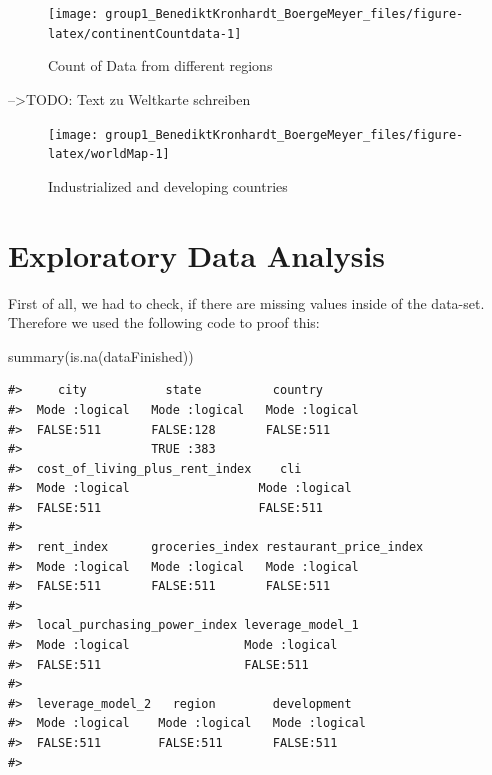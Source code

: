 \documentclass[
  11pt,
  a4paper,
  twoside]{scrbook}
\newenvironment{Shaded}{\begin{snugshade}}{\end{snugshade}}
\newcommand{\FunctionTok}[1]{\textcolor[rgb]{0.00,0.00,0.00}{#1}}
\newcommand{\NormalTok}[1]{#1}
\begin{document}
\begin{figure}

{\centering \texttt{[image: group1\_BenediktKronhardt\_BoergeMeyer\_files/figure-latex/continentCountdata-1]} 

}

\caption{Count of Data from different regions}\label{fig:continentCountdata}
\end{figure}

--\textgreater TODO: Text zu Weltkarte schreiben

\begin{figure}

{\centering \texttt{[image: group1\_BenediktKronhardt\_BoergeMeyer\_files/figure-latex/worldMap-1]} 

}

\caption{Industrialized and developing countries}\label{fig:worldMap}
\end{figure}

\hypertarget{exploratory-data-analysis}{%
\section{Exploratory Data Analysis}\label{exploratory-data-analysis}}

First of all, we had to check, if there are missing values inside of the data-set. Therefore we used the following code to proof this:

\linespread{1}

\begin{Shaded}
\begin{Highlighting}[]
\FunctionTok{summary}\NormalTok{(}\FunctionTok{is.na}\NormalTok{(dataFinished))}
\end{Highlighting}
\end{Shaded}

\linespread{1}

\begin{verbatim}
#>     city           state          country       
#>  Mode :logical   Mode :logical   Mode :logical  
#>  FALSE:511       FALSE:128       FALSE:511      
#>                  TRUE :383                      
#>  cost_of_living_plus_rent_index    cli         
#>  Mode :logical                  Mode :logical  
#>  FALSE:511                      FALSE:511      
#>                                                
#>  rent_index      groceries_index restaurant_price_index
#>  Mode :logical   Mode :logical   Mode :logical         
#>  FALSE:511       FALSE:511       FALSE:511             
#>                                                        
#>  local_purchasing_power_index leverage_model_1
#>  Mode :logical                Mode :logical   
#>  FALSE:511                    FALSE:511       
#>                                               
#>  leverage_model_2   region        development    
#>  Mode :logical    Mode :logical   Mode :logical  
#>  FALSE:511        FALSE:511       FALSE:511      
#> 
\end{verbatim}
\end{document}
